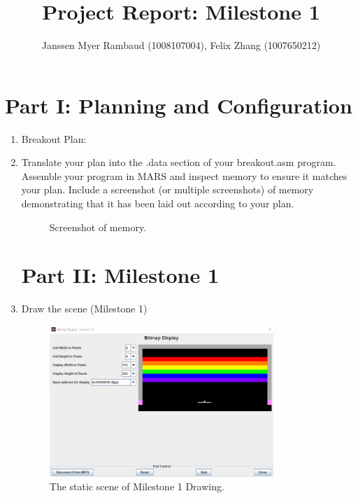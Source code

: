 \documentclass{article}
\title{Project Report: Milestone 1}
\author{Janssen Myer Rambaud (1008107004), Felix Zhang (1007650212)}
\begin{document}
\maketitle

\section{Part I: Planning and Configuration}

\begin{enumerate}
\item Breakout Plan:

\item Translate your plan into the .data section of your breakout.asm program. Assemble your program in MARS and inspect memory to ensure it matches your plan. Include a screenshot (or multiple screenshots) of memory demonstrating that it has been laid out according to your plan.

\begin{figure}[ht!]
    \centering
    \caption{Screenshot of memory.}
    \label{f:part1_memory_writer}
\end{figure}

\newpage

\section{Part II: Milestone 1}

\item Draw the scene (Milestone 1)

\begin{figure}[ht!]
    \centering
    \includegraphics[width=0.8\textwidth]{milestone1_drawing.png}
    \caption{The static scene of Milestone 1 Drawing.}
    \label{f:milestone1_drawing}
\end{figure}

\end{enumerate}
\end{document}
